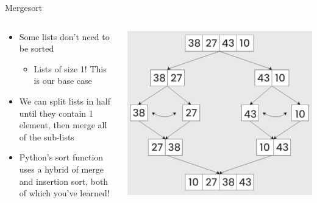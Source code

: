 \documentclass[
  ignorenonframetext,
]{beamer}
\providecommand{\tightlist}{%
  \setlength{\itemsep}{0pt}\setlength{\parskip}{0pt}}\usepackage{longtable,booktabs,array}
\begin{document}
\begin{frame}{Mergesort}
\protect\hypertarget{mergesort-1}{}
\begin{columns}[T]
\begin{column}{0.5\textwidth}
\begin{itemize}
\item
  Some lists don't need to be sorted

  \begin{itemize}
  \tightlist
  \item
    Lists of size 1! This is our base case
  \end{itemize}
\item
  We can split lists in half until they contain 1 element, then merge
  all of the sub-lists
\item
  Python's sort function uses a hybrid of merge and insertion sort, both
  of which you've learned!
\end{itemize}
\end{column}

\begin{column}{0.5\textwidth}
\includegraphics{images/merge-sort.png}
\end{column}
\end{columns}
\end{frame}
\end{document}
